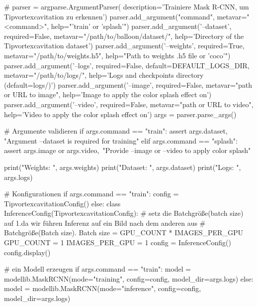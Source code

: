 {{    # 
    parser = argparse.ArgumentParser(
        description='Trainiere Mask R-CNN, um Tipvortexcavitation zu erkennen')
    parser.add_argument("command",
                        metavar="<command>",
                        help="'train' or 'splash'")
    parser.add_argument('--dataset', required=False,
                        metavar="/path/to/balloon/dataset/",
                        help='Directory of the Tipvortexcavitation dataset')
    parser.add_argument('--weights', required=True,
                        metavar="/path/to/weights.h5",
                        help="Path to weights .h5 file or 'coco'")
    parser.add_argument('--logs', required=False,
                        default=DEFAULT_LOGS_DIR,
                        metavar="/path/to/logs/",
                        help='Logs and checkpoints directory (default=logs/)')
    parser.add_argument('--image', required=False,
                        metavar="path or URL to image",
                        help='Image to apply the color splash effect on')
    parser.add_argument('--video', required=False,
                        metavar="path or URL to video",
                        help='Video to apply the color splash effect on')
    args = parser.parse_args()

    # Argumente validieren
    if args.command == "train":
        assert args.dataset, "Argument --dataset is required for training"
    elif args.command == "splash":
        assert args.image or args.video,\
               "Provide --image or --video to apply color splash"

    print("Weights: ", args.weights)
    print("Dataset: ", args.dataset)
    print("Logs: ", args.logs)

    # Konfigurationen
    if args.command == "train":
        config = TipvortexcavitationConfig()
    else:
        class InferenceConfig(TipvortexcavitationConfig):
            # setz die Batchgröße(batch size) auf 1.da wir führen Inferenz auf ein Bild nach dem anderen aus 
            # Batchgröße(Batch size). Batch size = GPU_COUNT * IMAGES_PER_GPU
            GPU_COUNT = 1
            IMAGES_PER_GPU = 1
        config = InferenceConfig()
    config.display()

    # ein Modell erzeugen 
    if args.command == "train":
        model = modellib.MaskRCNN(mode="training", config=config,
                                  model_dir=args.logs)
    else:
        model = modellib.MaskRCNN(mode="inference", config=config,
                                  model_dir=args.logs)

}}
